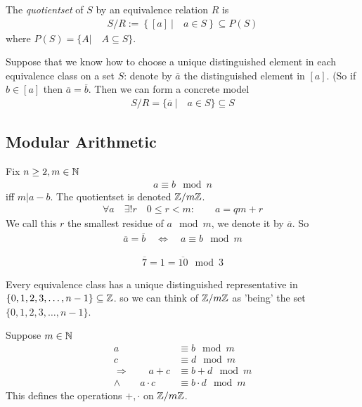 \begin{df}
The \emph{quotientset} of $S$ by an equivalence relation $R$ is
\begin{align*}
S/R := \left\{ [a]~| \quad  a \in S \right\} \subseteq P(S)
\end{align*}
where $P(S) = \{A | \quad A \subseteq S \}$.
\end{df}

Suppose that we know how to choose a unique distinguished element in each equivalence class on a set $S$:
denote by $\overline a$ the distinguished element in $[a]$. (So if $b \in [a]$ then $\overline a = \overline b$. Then we can form a concrete model
\begin{align*}
S/R = \{ \overline a ~ | \quad a \in S \} \subseteq S
\end{align*}

\subsection{Modular Arithmetic}
Fix $n \geq 2, m \in \mathbb N$
\begin{align*}
a \equiv b \mod n
\end{align*}
iff $m|a-b$.
The quotientset is denoted $\mathbb Z/m\mathbb Z$.
\begin{align*}
\forall a \quad \exists ! r \quad 0 \leq r < m: \qquad a = qm +r
\end{align*}
We call this $r$ the smallest residue of $a \mod m$, we denote it by $\overline a$.
So 
\begin{align*}
\overline a = \overline b \quad \Leftrightarrow \quad a \equiv b \mod m
\end{align*}
\begin{ex}
	\begin{align*}
	\overline 7 = 1 = \overline{10} \mod 3
	\end{align*}
\end{ex}
Every equivalence class has a unique distinguished representative in $\{0,1,2,3, \dots, n-1\} \subseteq \mathbb Z$. so we can think of $\mathbb Z/m\mathbb Z$ as 'being' the set $\{0,1,2,3, \dots, n-1\}$.

\begin{tm}
	Suppose $m \in \mathbb N$
	\begin{align*}
	a & \equiv b \mod m \\
	c & \equiv d \mod m \\
	\Rightarrow \qquad a+c & \equiv b+d \mod m \\
	\wedge \qquad a \cdot c & \equiv b \cdot d \mod m
	\end{align*}
	This defines the operations $+, \cdot$ on $\mathbb Z/m\mathbb Z$.
\end{tm}

